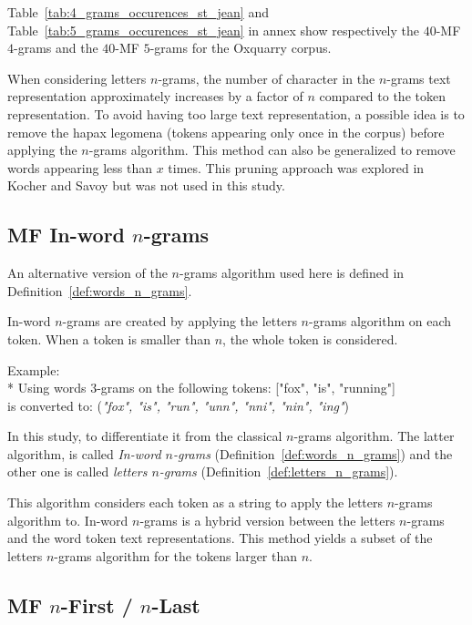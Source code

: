Table~\ref{tab:4_grams_occurences_st_jean} and Table~\ref{tab:5_grams_occurences_st_jean} in annex show respectively the $40$-MF $4$-grams and the $40$-MF $5$-grams for the Oxquarry corpus.

When considering letters $n$-grams, the number of character in the $n$-grams text representation approximately increases by a factor of $n$ compared to the token representation.
To avoid having too large text representation, a possible idea is to remove the hapax legomena (tokens appearing only once in the corpus) before applying the $n$-grams algorithm.
This method can also be generalized to remove words appearing less than $x$ times.
This pruning approach was explored in Kocher and Savoy \cite{kocher_linking} but was not used in this study.

\subsection{MF In-word $n$-grams}

An alternative version of the $n$-grams algorithm used here is defined in Definition~\ref{def:words_n_grams}.

\begin{definition}
  In-word $n$-grams are created by applying the letters $n$-grams algorithm on each token.
  When a token is smaller than $n$, the whole token is considered.

  Example: \\*
  Using words $3$-grams on the following tokens: ["fox", "is", "running"] \\
  is converted to: (\textit{"fox", "is", "run", "unn", "nni", "nin", "ing"})
\end{definition}

In this study, to differentiate it from the classical $n$-grams algorithm.
The latter algorithm, is called \textit{In-word $n$-grams} (Definition~\ref{def:words_n_grams}) and the other one is called \textit{letters $n$-grams} (Definition~\ref{def:letters_n_grams}).

This algorithm considers each token as a string to apply the letters $n$-grams algorithm to.
In-word $n$-grams is a hybrid version between the letters $n$-grams and the word token text representations.
This method yields a subset of the letters $n$-grams algorithm for the tokens larger than $n$.

\subsection{MF $n$-First / $n$-Last}

